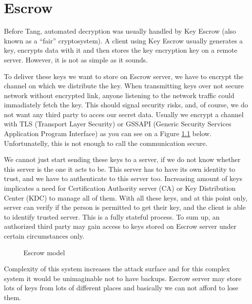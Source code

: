 \documentclass[../xdudla00-porting-Tang-to-Open-WRT.tex]{subfiles}
\begin{document}
\chapter{Escrow}\label{escrow}
Before Tang, automated decryption was usually handled by Key Escrow \cite{escrow} (also known as a “fair” cryptosystem).
A client using Key Escrow usually generates a key, encrypts data with it and then stores the key encryption key on a remote server.
However, it is not as simple as it sounds.

To deliver these keys we want to store on Escrow server, we have to encrypt the channel on which we distribute the key.
When transmitting keys over not secure network without encrypted link, anyone listening to the network traffic could immadiately fetch the key.
This should signal security risks, and, of course, we do not want any third party to acces our secret data.
Usually we encrypt a channel with TLS \cite{tls}(Transport Layer Security) or GSSAPI \cite{gssapi}
 (Generic Security Services Application Program Interface) as you can see on a Figure \ref{fig:escrowmodel} below.
Unfortunatelly, this is not enough to call the communication secure.

We cannot just start sending these keys to a server, if we do not know whether this server is the one it acts to be.
This server has to have its own identity to trust, and we have to authenticate to this server too.
Increasing amount of keys implicates a need for Certification Authority server (CA)\cite{ca} or Key Distribution Center (KDC) \cite{kdc} to manage all of them.
With all these keys, and at this point only, server can verify if the person is permitted to get their key, and the client is able to identify trusted server.
This is a fully stateful process.
To sum up, an authorized third party may gain access to keys stored on Escrow server under certain circumstances only.

\begin{figure}[h]
    \centering
    \caption{Escrow model}
    \label{fig:escrowmodel}
\end{figure}

Complexity of this system increases the attack surface and for this complex system it would be unimaginable not to have backups.
Escrow server may store lots of keys from lots of different places and basically we can not afford to lose them.
\end{document}
